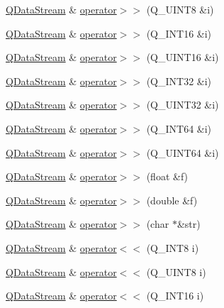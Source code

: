 \begin{DoxyCompactItemize}
\item 
\hyperlink{class_q_data_stream}{Q\-Data\-Stream} \& \hyperlink{class_q_data_stream_a66919f08c4a4ec99f8dd8ee49e4bd69c}{operator$>$$>$} (Q\-\_\-\-U\-I\-N\-T8 \&i)
\item 
\hyperlink{class_q_data_stream}{Q\-Data\-Stream} \& \hyperlink{class_q_data_stream_aa99d896eebd84b4f50c1a1c4e5147d43}{operator$>$$>$} (Q\-\_\-\-I\-N\-T16 \&i)
\item 
\hyperlink{class_q_data_stream}{Q\-Data\-Stream} \& \hyperlink{class_q_data_stream_acf2f3045e740e2e97b7e6be0e26d94da}{operator$>$$>$} (Q\-\_\-\-U\-I\-N\-T16 \&i)
\item 
\hyperlink{class_q_data_stream}{Q\-Data\-Stream} \& \hyperlink{class_q_data_stream_adc29145913bb3865cf02f74dd417504f}{operator$>$$>$} (Q\-\_\-\-I\-N\-T32 \&i)
\item 
\hyperlink{class_q_data_stream}{Q\-Data\-Stream} \& \hyperlink{class_q_data_stream_a58808e7d7474ec9df2a81b96cb944fba}{operator$>$$>$} (Q\-\_\-\-U\-I\-N\-T32 \&i)
\item 
\hyperlink{class_q_data_stream}{Q\-Data\-Stream} \& \hyperlink{class_q_data_stream_af9754871ea12971a697b650ea0fbdc7f}{operator$>$$>$} (Q\-\_\-\-I\-N\-T64 \&i)
\item 
\hyperlink{class_q_data_stream}{Q\-Data\-Stream} \& \hyperlink{class_q_data_stream_af8959500642c3751593d6654e2f8506d}{operator$>$$>$} (Q\-\_\-\-U\-I\-N\-T64 \&i)
\item 
\hyperlink{class_q_data_stream}{Q\-Data\-Stream} \& \hyperlink{class_q_data_stream_a400c7acc10a87b0283b5d0a4fb438f5e}{operator$>$$>$} (float \&f)
\item 
\hyperlink{class_q_data_stream}{Q\-Data\-Stream} \& \hyperlink{class_q_data_stream_a552731f71d8528a34d98ae48ad4915a1}{operator$>$$>$} (double \&f)
\item 
\hyperlink{class_q_data_stream}{Q\-Data\-Stream} \& \hyperlink{class_q_data_stream_a7b27f047be47212548986b8b6cd28635}{operator$>$$>$} (char $\ast$\&str)
\item 
\hyperlink{class_q_data_stream}{Q\-Data\-Stream} \& \hyperlink{class_q_data_stream_a38426efa1d04bf3cf11d63addec5c9bd}{operator$<$$<$} (Q\-\_\-\-I\-N\-T8 i)
\item 
\hyperlink{class_q_data_stream}{Q\-Data\-Stream} \& \hyperlink{class_q_data_stream_a9a164a62a8bee152fd86a4d8269b6dda}{operator$<$$<$} (Q\-\_\-\-U\-I\-N\-T8 i)
\item 
\hyperlink{class_q_data_stream}{Q\-Data\-Stream} \& \hyperlink{class_q_data_stream_a6c67acaefeb1d08d1cc2aea62630b8af}{operator$<$$<$} (Q\-\_\-\-I\-N\-T16 i)

\end{DoxyCompactItemize}
